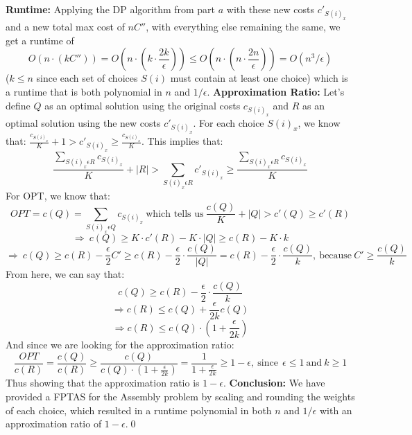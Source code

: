 \documentclass[oneside]{homework} %
\begin{document}
\textbf{Runtime:} 
\newline
Applying the DP algorithm from part $a$ with these new costs $c'_{S(i)_x}$ and a new total max cost of $nC''$, with everything else remaining the same, we get a runtime of $$O(n\cdot(kC'')) = O(n\cdot(k\cdot\frac{2k}{\epsilon})) \leq O(n\cdot(n\cdot\frac{2n}{\epsilon})) = O(n^3/\epsilon)$$ ($k \leq n$ since each set of choices $S(i)$ must contain at least one choice) which is a runtime that is both polynomial in $n$ and $1/\epsilon$.
\newline
\newline
\textbf{Approximation Ratio:} 
\newline
Let's define $Q$ as an optimal solution using the original costs $c_{S(i)_x}$ and $R$ as an optimal solution using the new costs $c'_{S(i)_x}$.
\newline
For each choice $S(i)_x$, we know that: $\frac{c_{S(i)_x}}{K} + 1 > c'_{S(i)_x} \geq \frac{c_{S(i)_x}}{K}$. This implies that: 
$$\frac{\sum\limits_{S(i)_x\epsilon R}c_{S(i)_x}}{K} + |R| > \sum\limits_{S(i)_x\epsilon R}c'_{S(i)_x} \geq \frac{\sum\limits_{S(i)_x\epsilon R}c_{S(i)_x}}{K}$$
For OPT, we know that: 
$$OPT = c(Q) = \sum\limits_{S(i)_x\epsilon Q}c_{S(i)_x} \ \text{which tells us} \ \frac{c(Q)}{K} + |Q| > c'(Q) \geq c'(R)$$ 
$$\Longrightarrow \ c(Q) \geq K \cdot c'(R) - K \cdot |Q| \geq c(R) - K \cdot k$$
$$\Longrightarrow \ c(Q) \geq c(R) - \frac{\epsilon}{2}C' \geq c(R) - \frac{\epsilon}{2}\cdot\frac{c(Q)}{|Q|} = c(R) - \frac{\epsilon}{2}\cdot\frac{c(Q)}{k}, \ \text{because} \ C' \geq \frac{c(Q)}{k}$$
From here, we can say that:
$$c(Q) \geq c(R) - \frac{\epsilon}{2}\cdot \frac{c(Q)}{k}$$
$$\Longrightarrow c(R) \leq c(Q) + \frac{\epsilon}{2k}c(Q)$$
$$\Longrightarrow c(R) \leq c(Q) \cdot (1 + \frac{\epsilon}{2k})$$
And since we are looking for the approximation ratio:
$$\frac{OPT}{c(R)} = \frac{c(Q)}{c(R)} \geq \frac{c(Q)}{c(Q) \cdot (1 + \frac{\epsilon}{2k})} = \frac{1}{1 +\frac{\epsilon}{2k}} \geq 1 - \epsilon, \ \text{since} \ \ \epsilon \leq 1 \ \text{and} \ k \geq 1$$
\newline
Thus showing that the approximation ratio is $1 - \epsilon$.
\newline
\newline
\textbf{Conclusion:} We have provided a FPTAS for the Assembly problem by scaling and rounding the weights of each choice, which resulted in a runtime polynomial in both $n$ and $1/\epsilon$ with an approximation ratio of $1 - \epsilon$.\hfill\qed
\end{document}
